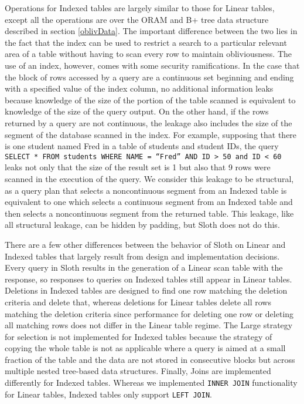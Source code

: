 \documentclass[USenglish,oneside,twocolumn]{article}
\def\name/{Sloth}
\begin{document}
Operations for Indexed tables are largely similar to those for Linear tables, except all the operations are over the ORAM and B+ tree data structure described in section \ref{oblivData}. The important difference between the two lies in the fact that the index can be used to restrict a search to a particular relevant area of a table without having to scan every row to maintain obliviousness. The use of an index, however, comes with some security ramifications. In the case that the block of rows accessed by a query are a continuous set beginning and ending with a specified value of the index column, no additional information leaks because knowledge of the size of the portion of the table scanned is equivalent to knowledge of the size of the query output. On the other hand, if the rows returned by a query are not continuous, the leakage also includes the size of the segment of the database scanned in the index. For example, supposing that there is one student named Fred in a table of students and student IDs,  the query \texttt{SELECT * FROM students WHERE NAME = ``Fred'' AND ID > 50 and ID < 60} leaks not only that the size of the result set is 1 but also that 9 rows were scanned in the execution of the query. We consider this leakage to be structural, as a query plan that selects a noncontinuous segment from an Indexed table is equivalent to one which selects a continuous segment from an Indexed table and then selects a noncontinuous segment from the returned table. This leakage, like all structural leakage, can be hidden by padding, but \name/ does not do this. 

There are a few other differences between the behavior of \name/ on Linear and Indexed tables that largely result from design and implementation decisions. Every query in \name/ results in the generation of a Linear scan table with the response, so responses to queries on Indexed tables still appear in Linear tables. Deletions in Indexed tables are designed to find one row matching the deletion criteria and delete that, whereas deletions for Linear tables delete all rows matching the deletion criteria since performance for deleting one row or deleting all matching rows does not differ in the Linear table regime. The Large strategy for selection is not implemented for Indexed tables because the strategy of copying the whole table is not as applicable where a query is aimed at a small fraction of the table and the data are not stored in consecutive blocks but across multiple nested tree-based data structures. Finally, Joins are implemented differently for Indexed tables. Whereas we implemented \texttt{INNER JOIN} functionality for Linear tables, Indexed tables only support \texttt{LEFT JOIN}. 
\end{document}
